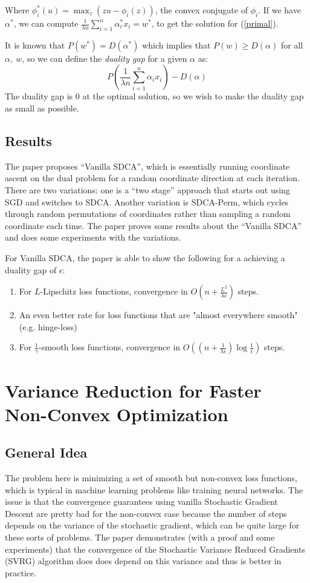 \documentclass[12pt]{report}
\begin{document}
Where $\phi^*_i(u) = \max_z(zu - \phi_i(z))$, the convex conjugate of $\phi_i$. If we have $\alpha^*$, we can compute $\frac1{\lambda n}\sum_{i=1}^n\alpha_i^*x_i = w^*$, to get the solution for (\ref{primal}).

It is known that $P(w^*) = D(\alpha^*)$ which implies that $P(w) \geq D(\alpha)$ for all $\alpha,~w$, so we can define the \textit{duality gap} for a given $\alpha$ as:
\begin{equation}
	P\left(\frac1{\lambda n}\sum_{i=1}^n\alpha_ix_i\right) - D(\alpha)
\end{equation}
The duality gap is 0 at the optimal solution, so we wish to make the duality gap as small as possible.

\subsection{Results}

The paper proposes ``Vanilla SDCA'', which is essentially running coordinate ascent on the dual problem for a random coordinate direction at each iteration.  There are two variations: one is a ``two stage'' approach that starts out using SGD and switches to SDCA.  Another variation is SDCA-Perm, which cycles through random permutations of coordinates rather than sampling a random coordinate each time.  The paper proves some results about the ``Vanilla SDCA'' and does some experiments with the variations.

For Vanilla SDCA, the paper is able to show the following for a achieving a duality gap of $\epsilon$:
\begin{enumerate}
	\item For $L$-Lipschitz loss functions, convergence in $O\left(n + \frac{L^2}{\lambda \epsilon}\right)$ steps.
	\item An even better rate for loss functions that are "almost everywhere smooth" (e.g. hinge-loss)
	\item For $\frac1\gamma$-smooth loss functions, convergence in $O\left(\left(n + \frac1{\lambda\epsilon}\right)\log\frac1\epsilon \right)$ steps.
\end{enumerate}

\section{Variance Reduction for Faster Non-Convex Optimization}

\subsection{General Idea}
The problem here is minimizing a set of smooth but non-convex loss functions, which is typical in machine learning problems like training neural networks. The issue is that the convergence guarantees using vanilla Stochastic Gradient Descent are pretty bad for the non-convex case because the number of steps depends on the variance of the stochastic gradient, which can be quite large for these sorts of problems.  The paper demonstrates (with a proof and some experiments) that the convergence of the Stochastic Variance Reduced Gradients (SVRG) algorithm does does depend on this variance and thus is better in practice.
\end{document}
